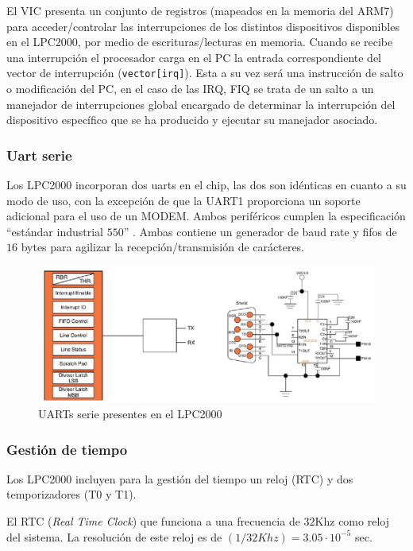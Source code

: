 \documentclass[10pt,a4paper]{article}
\begin{document}
	El VIC presenta un conjunto de registros (mapeados en la memoria del ARM7) para acceder/controlar las interrupciones de los distintos dispositivos disponibles en el LPC2000, por medio de escrituras/lecturas en memoria.
	Cuando se recibe una interrupción el procesador carga en el PC la entrada correspondiente del vector de interrupción (\texttt{vector[irq]}).  Esta a su vez será una instrucción de salto o modificación del PC, en el caso de las IRQ, FIQ se trata de un salto a un manejador de interrupciones global encargado de determinar la interrupción del dispositivo específico que se ha producido y ejecutar su manejador asociado.
		
	\subsubsection{Uart serie}
		
	Los LPC2000 incorporan dos uarts en el chip, las dos son idénticas en cuanto a su modo de uso, con la excepción de que la UART1 proporciona un soporte adicional para el uso de un MODEM. Ambos periféricos cumplen la especificación ``estándar industrial $550$'' \cite{UART}. Ambas contiene un generador de baud rate y fifos de $16$ bytes para agilizar la recepción/transmisión de carácteres.
	
	\begin{figure}[htbp]
	\begin{center}
	\includegraphics[width = 0.5\columnwidth]{img/lpcuart}
	\end{center}
	
	\caption{UARTs serie presentes en el LPC2000}
	\label{fig:lpcuart}
	\end{figure}
		
	\subsubsection{Gestión de tiempo}

	Los LPC2000 incluyen para la gestión del tiempo un reloj (RTC) y dos temporizadores (T0 y T1).

	El RTC (\emph{Real Time Clock}) que funciona a una frecuencia de $32$Khz como reloj del sistema. La resolución de este reloj es de $(1 / 32 Khz) = 3.05 \cdot 10^{-5}$ sec.
\end{document}
